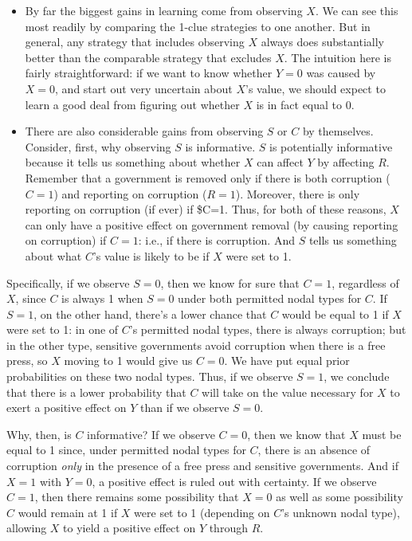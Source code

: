 \documentclass[12pt,]{book}
\begin{document}
\begin{itemize}
\item
  By far the biggest gains in learning come from observing \(X\). We can see this most readily by comparing the 1-clue strategies to one another. But in general, any strategy that includes observing \(X\) always does substantially better than the comparable strategy that excludes \(X\). The intuition here is fairly straightforward: if we want to know whether \(Y=0\) was caused by \(X=0\), and start out very uncertain about \(X\)'s value, we should expect to learn a good deal from figuring out whether \(X\) is in fact equal to \(0\).
\item
  There are also considerable gains from observing \(S\) or \(C\) by themselves. Consider, first, why observing \(S\) is informative. \(S\) is potentially informative because it tells us something about whether \(X\) can affect \(Y\) by affecting \(R\). Remember that a government is removed only if there is both corruption (\(C=1\)) and reporting on corruption (\(R=1\)). Moreover, there is only reporting on corruption (if ever) if \$C=1. Thus, for both of these reasons, \(X\) can only have a positive effect on government removal (by causing reporting on corruption) if \(C=1\): i.e., if there is corruption. And \(S\) tells us something about what \(C\)'s value is likely to be if \(X\) were set to 1.
\end{itemize}

Specifically, if we observe \(S=0\), then we know for sure that \(C=1\), regardless of \(X\), since \(C\) is always 1 when \(S=0\) under both permitted nodal types for \(C\). If \(S=1\), on the other hand, there's a lower chance that \(C\) would be equal to 1 if \(X\) were set to 1: in one of \(C\)'s permitted nodal types, there is always corruption; but in the other type, sensitive governments avoid corruption when there is a free press, so \(X\) moving to 1 would give us \(C=0\). We have put equal prior probabilities on these two nodal types. Thus, if we observe \(S=1\), we conclude that there is a lower probability that \(C\) will take on the value necessary for \(X\) to exert a positive effect on \(Y\) than if we observe \(S=0\).

Why, then, is \(C\) informative? If we observe \(C=0\), then we know that \(X\) must be equal to 1 since, under permitted nodal types for \(C\), there is an absence of corruption \emph{only} in the presence of a free press and sensitive governments. And if \(X=1\) with \(Y=0\), a positive effect is ruled out with certainty. If we observe \(C=1\), then there remains some possibility that \(X=0\) as well as some possibility \(C\) would remain at 1 if \(X\) were set to 1 (depending on \(C\)'s unknown nodal type), allowing \(X\) to yield a positive effect on \(Y\) through \(R\).
\end{document}
